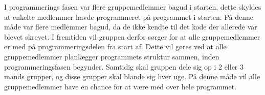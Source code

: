 \vspace{5mm}

I programmerings fasen var flere gruppemedlemmer bagud i starten, dette skyldes at enkelte medlemmer havde programmeret på programmet i starten. På denne måde var flere medlemmer bagud, da de ikke kendte til det kode der allerede var blevet skrevet. I fremtiden vil gruppen derfor sørger for at alle gruppemedlemmer er med på programmeringsdelen fra start af. Dette vil gøres ved at alle gruppemedlemmer planlægger programmets struktur sammen, inden programmeringsfasen begynder. Samtidig skal gruppen dele sig op i 2 eller 3 mands grupper, og disse grupper skal blande sig hver uge. På denne måde vil alle gruppemedlemmer have en chance for at være med over hele programmet.  